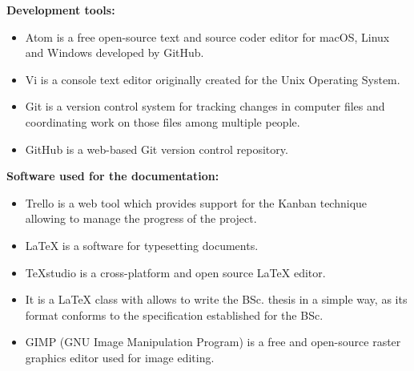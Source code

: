 \documentclass{pre-tfg}
\begin{document}
\textbf{Development tools:} \vspace{-4mm}
\begin{itemize}[noitemsep,nolistsep]
	\item {} Atom is a free open-source text and source coder editor for macOS, Linux and Windows developed by GitHub.
	
	\item {} Vi is a console text editor originally created for the Unix  Operating System. 
	
	\item {} Git is a version control system for tracking changes in computer files and coordinating work on those files among multiple people.
	
	\item {} GitHub is a web-based Git version control repository.
	
	
	
\end{itemize} \vspace{-2mm}

\textbf{Software used for the documentation:} \vspace{-4mm}
\begin{itemize}[noitemsep,nolistsep]
	\item {} Trello is a web tool which provides support for the Kanban technique allowing to manage the progress of the project.
	
	\item {} \LaTeX{} is a software for typesetting documents.
	
	\item {} TeXstudio is a cross-platform and open source \LaTeX{} editor.
	
	\item {} It is a \LaTeX{} class with allows to write the BSc. thesis in a simple way, as its format conforms to the specification established for the BSc.
	
	\item {} GIMP (GNU Image Manipulation Program) is a free and open-source raster graphics editor used for image editing.
	
	
\end{itemize}


%

\singlespacing

\end{document}
